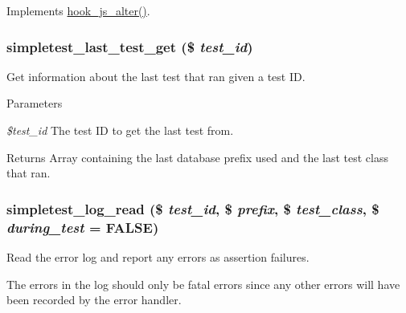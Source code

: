 \label{simpletest_8module_aaa4dfc94748777a27c27d02366a7cab7}
Implements \hyperlink{group__hooks_ga4e6dc7148292e5d6ce1754927a5ff06d}{hook\_\-js\_\-alter()}. \hypertarget{simpletest_8module_a8b9a598940ae51908fa3a91407ce8425}{
\subsubsection[{simpletest\_\-last\_\-test\_\-get}]{\setlength{\rightskip}{0pt plus 5cm}simpletest\_\-last\_\-test\_\-get (\$ {\em test\_\-id})}}
\label{simpletest_8module_a8b9a598940ae51908fa3a91407ce8425}
Get information about the last test that ran given a test ID.


\begin{DoxyParams}{Parameters}
\item[{\em \$test\_\-id}]The test ID to get the last test from. \end{DoxyParams}
\begin{DoxyReturn}{Returns}
Array containing the last database prefix used and the last test class that ran. 
\end{DoxyReturn}
\hypertarget{simpletest_8module_a5e7d71f99a71ace10b051dd720bd42d3}{
\subsubsection[{simpletest\_\-log\_\-read}]{\setlength{\rightskip}{0pt plus 5cm}simpletest\_\-log\_\-read (\$ {\em test\_\-id}, \/  \$ {\em prefix}, \/  \$ {\em test\_\-class}, \/  \$ {\em during\_\-test} = {\ttfamily FALSE})}}
\label{simpletest_8module_a5e7d71f99a71ace10b051dd720bd42d3}
Read the error log and report any errors as assertion failures.

The errors in the log should only be fatal errors since any other errors will have been recorded by the error handler.


